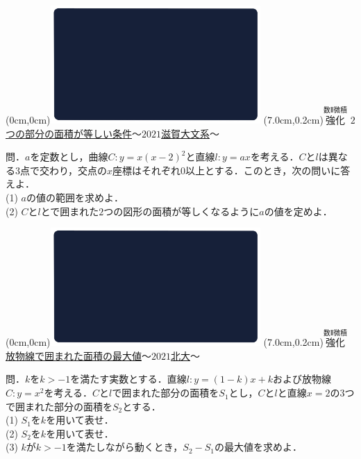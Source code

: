 \documentclass[10pt,
fleqn,
dvipdfmx,
uplatex
]{jsarticle}
\begin{document}
\bf\boldmath



\at(0cm,0cm){\includegraphics[width=8cm,bb=0 0 1920 1080]{./youtube/thumbnails/templates/smart_background/数II微積.jpeg}}
\at(7.0cm,0.2cm){\small\color{bradorange}$\overset{\text{数Ⅱ微積}}{\text{強化}}$}
{\color{orange}\normalsize\underline{$2$つの部分の面積が等しい条件$〜2021$滋賀大文系$〜$}}\vspace{0.3zw}

\small 
問．$a$を定数とし，曲線$C:y=x\left(x-2\right)^2$と直線$l:y=ax$を考える．$C$と$l$は異なる$3$点で交わり，交点の$x$座標はそれぞれ$0$以上とする．このとき，次の問いに答えよ．\\
(1)  $a$の値の範囲を求めよ．\\
(2)  $C$と$l$とで囲まれた$2$つの図形の面積が等しくなるように$a$の値を定めよ．\\



\newpage



\at(0cm,0cm){\includegraphics[width=8cm,bb=0 0 1920 1080]{./youtube/thumbnails/templates/smart_background/数II微積.jpeg}}
\at(7.0cm,0.2cm){\small\color{bradorange}$\overset{\text{数Ⅱ微積}}{\text{強化}}$}
{\color{orange}\normalsize\underline{放物線で囲まれた面積の最大値$〜2021$北大$〜$}}\vspace{0.3zw}

\scriptsize 
問．$k$を$k>-1$を満たす実数とする．直線$l:y=\left(1-k\right)x+k$および放物線$C:y=x^2$を考える．$C$と$l$で囲まれた部分の面積を$S_1$とし，$C$と$l$と直線$x=2$の$3$つで囲まれた部分の面積を$S_2$とする．\\
(1)  $S_1$を$k$を用いて表せ．\\
(2)  $S_2$を$k$を用いて表せ．\\
(3)  $k$が$k>-1$を満たしながら動くとき，$S_2-S_1$の最大値を求めよ．\\
\end{document}
